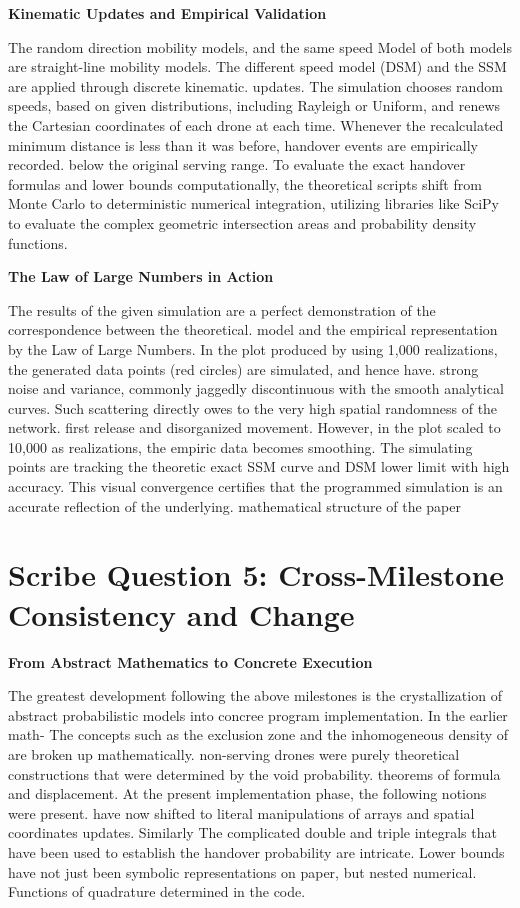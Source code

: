 \documentclass[12pt,a4paper]{article}
\begin{document}
\textbf{Kinematic Updates and Empirical Validation}

The random direction mobility models, and the same speed Model of both models are straight-line mobility models. The different speed model (DSM) and the SSM are applied through discrete kinematic. updates. The simulation chooses random speeds, based on given distributions, including Rayleigh or Uniform, and renews the Cartesian coordinates of each drone at each time. Whenever the recalculated minimum distance is less than it was before, handover events are empirically recorded. below the original serving range. To evaluate the exact handover formulas and lower bounds computationally, the theoretical scripts shift from Monte Carlo to deterministic numerical integration, utilizing libraries like SciPy to evaluate the complex geometric intersection areas and probability density functions.

\textbf{The Law of Large Numbers in Action}

The results of the given simulation are a perfect demonstration of the correspondence between the theoretical. model and the empirical representation by the Law of Large Numbers. In the plot produced by using 1,000 realizations, the generated data points (red circles) are simulated, and hence have. strong noise and variance, commonly jaggedly discontinuous with the smooth analytical curves. Such scattering directly owes to the very high spatial randomness of the network. first release and disorganized movement. However, in the plot scaled to 10,000 as realizations, the empiric data becomes smoothing. The simulating points are tracking the theoretic exact SSM curve and DSM lower limit with high accuracy. This visual convergence certifies that the programmed simulation is an accurate reflection of the underlying. mathematical structure of the paper 


\section*{Scribe Question 5: Cross-Milestone Consistency and Change}

\textbf{From Abstract Mathematics to Concrete Execution}

The greatest development following the above milestones is the crystallization of abstract probabilistic models into concree program implementation. In the earlier math- The concepts such as the exclusion zone and the inhomogeneous density of are broken up mathematically. non-serving drones were purely theoretical constructions that were determined by the void probability. theorems of formula and displacement. At the present implementation phase, the following notions were present. have now shifted to literal manipulations of arrays and spatial coordinates updates. Similarly The complicated double and triple integrals that have been used to establish the handover probability are intricate. Lower bounds have not just been symbolic representations on paper, but nested numerical. Functions of quadrature determined in the code. 
\end{document}
